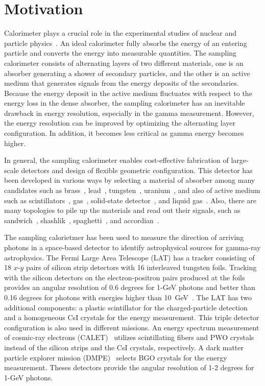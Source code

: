 \documentclass[12pt,times,draftclsnofoot,a4paper]{elsarticle}
\begin{document}
\linenumbers

\section{Motivation}
\label{sec:mot}

Calorimeter plays a crucial role in the experimental studies of nuclear and particle physics~\cite{unitext}. An ideal calorimeter fully absorbs the energy of an entering particle and converts the energy into measurable quantities. The sampling calorimeter consists of alternating layers of two different materials, one is an absorber generating a shower of secondary particles, and the other is an active medium that generates signals from the energy deposits of the secondaries. Because the energy deposit in the active medium fluctuates with respect to the energy loss in the dense absorber, the sampling calorimeter has an inevitable drawback in energy resolution, especially in the gamma measurement. However, the energy resolution can be improved by optimizing the alternating layer configuration.  In addition, it becomes less critical as gamma energy becomes higher.

In general, the sampling calorimeter enables cost-effective fabrication of large-scale detectors and design of flexible geometric configuration. This detector has been developed in various ways by selecting a material of absorber among many candidates such as brass~\cite{CMS:mat}, lead~\cite{CDF:mat}, tungsten~\cite{DELPHI:mat}, uranium~\cite{UGAS:mat}, and also of active medium such as scintillators~\cite{CMS:mat,CDF:mat}, gas~\cite{UGAS:mat}, solid-state detector~\cite{DELPHI:mat}, and liquid gas~\cite{LiqAR:mat}. Also, there are many topologies to pile up the materials and read out their signals, such as sandwich~\cite{KOTO:MB}, shashlik~\cite{shashlik:con}, spaghetti~\cite{KLOE:con}, and accordian~\cite{LiqAR:mat}.

The sampling calorietmer has been used to measure the direction of arriving photons in a space-based detector to identify astrophysical sources for gamma-ray astrophysics. The Fermi Large Area Telescope (LAT) has a tracker consisting of 18 $x$-$y$ pairs of silicon strip detectors with 16 interleaved tungsten foils. Tracking with the silicon detectors on the electron-positron pairs produced at the foils provides an angular resolution of 0.6 degrees for 1-GeV photons and better than 0.16 degrees for photons with energies higher than 10~GeV~\cite{FERMI:LAT}. The LAT has two additional components: a plastic scintillator for the charged-particle detection and a homogeneous CsI crystals for the energy measurement. This triple detector configuration is also used in different missions. An energy spectrum measurement of cosmic-ray electrons (CALET)~\cite{CALET} utilizes scintillating fibers and PWO crystals instead of the silicon strips and the CsI crystals, respectively. A dark matter particle explorer mission (DMPE)~\cite{DMPE} selects BGO crystals for the energy measurement. Theses detectors provide the angular resolution of 1-2 degrees for 1-GeV photons.
\end{document}
